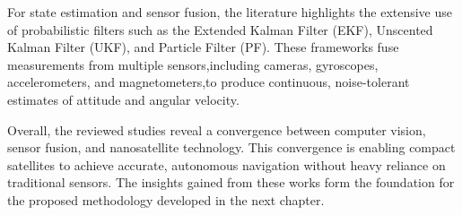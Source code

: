 \noindent
For state estimation and sensor fusion, the literature highlights the extensive use of probabilistic filters such as the Extended Kalman Filter (EKF), Unscented Kalman Filter (UKF), and Particle Filter (PF). These frameworks fuse measurements from multiple sensors,including cameras, gyroscopes, accelerometers, and magnetometers,to produce continuous, noise-tolerant estimates of attitude and angular velocity.
\vspace{0.5cm}

\noindent
Overall, the reviewed studies reveal a convergence between computer vision, sensor fusion, and nanosatellite technology. This convergence is enabling compact satellites to achieve accurate, autonomous navigation without heavy reliance on traditional sensors. The insights gained from these works form the foundation for the proposed methodology developed in the next chapter.